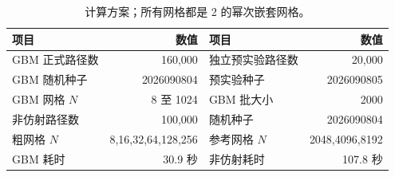 \begin{table}[H]\centering\small
\caption{计算方案；所有网格都是 2 的幂次嵌套网格。}\label{tab:protocol-cn}
\begin{tabular}{lrlr}\toprule
项目 & 数值 & 项目 & 数值\\\midrule
GBM 正式路径数 & 160,000 & 独立预实验路径数 & 20,000\\
GBM 随机种子 & 2026090804 & 预实验种子 & 2026090805\\
GBM 网格 $N$ & 8 至 1024 & GBM 批大小 & 2000\\
非仿射路径数 & 100,000 & 随机种子 & 2026090804\\
粗网格 $N$ & 8,16,32,64,128,256 & 参考网格 $N$ & 2048,4096,8192\\
GBM 耗时 & 30.9 秒 & 非仿射耗时 & 107.8 秒\\
\bottomrule\end{tabular}
\end{table}
